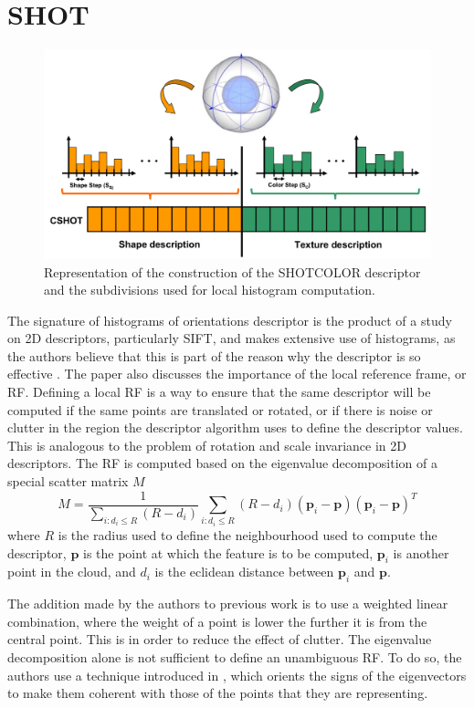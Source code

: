 \documentclass[11pt,a4paper]{kth-mag}
\begin{document}
\section{SHOT}
\begin{figure}
  \centering
  \includegraphics[width=\textwidth]{images/shotcolor}
  \caption{Representation of the construction of the SHOTCOLOR descriptor and
    the subdivisions used for local histogram computation.}
  \label{fig:shotcolor}
\end{figure}
The signature of histograms of orientations descriptor is the product of a study
on 2D descriptors, particularly SIFT, and makes extensive use of histograms, as
the authors believe that this is part of the reason why the descriptor is so
effective \cite{tombari2010unique}. The paper also discusses the importance of
the local reference frame, or RF. Defining a local RF is a way to ensure that
the same descriptor will be computed if the same points are translated or
rotated, or if there is noise or clutter in the region the descriptor algorithm
uses to define the descriptor values. This is analogous to the problem of
rotation and scale invariance in 2D descriptors. The RF is computed based on the
eigenvalue decomposition of a special scatter matrix $M$
\begin{equation}
  \label{eq:12}
  M=\frac{1}{\sum_{i:d_i\leq R}(R-d_i)}\sum_{i:d_i\leq R}(R-d_i)(\mathbf{p}_i-\mathbf{p})(\mathbf{p}_i-\mathbf{p})^T
\end{equation}
where $R$ is the radius used to define the neighbourhood used to compute the
descriptor, $\mathbf{p}$ is the point at which the feature is to be computed,
$\mathbf{p}_i$ is another point in the cloud, and $d_i$ is the eclidean
distance between $\mathbf{p}_i$ and $\mathbf{p}$.

The addition made by the authors to previous work is to use a weighted linear
combination, where the weight of a point is lower the further it is from the
central point. This is in order to reduce the effect of clutter. The eigenvalue
decomposition alone is not sufficient to define an unambiguous RF. To do so, the
authors use a technique introduced in \cite{bro2008resolving}, which orients the
signs of the eigenvectors to make them coherent with those of the points that
they are representing.
\end{document}
